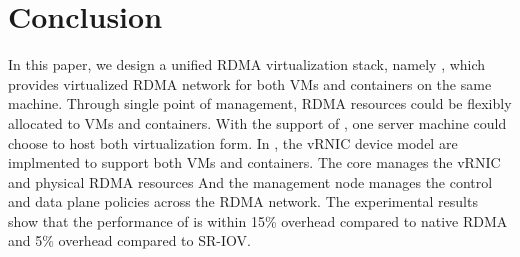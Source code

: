 \section{Conclusion} \label{conclusion}
In this paper, we design a unified RDMA virtualization stack, namely \sys, which provides virtualized RDMA network for both VMs and containers on the same machine.
Through single point of management, RDMA resources could be flexibly allocated to VMs and containers. With the support of \sys, one server machine could choose to host both virtualization form.
In \sys, the vRNIC device model are implmented to support both VMs and containers. The \sys core manages the vRNIC and physical RDMA resources And the management node manages the control and data plane policies across the RDMA network. The experimental results show that the performance of \sys is within 15\% overhead compared to native RDMA and 5\% overhead compared to SR-IOV.